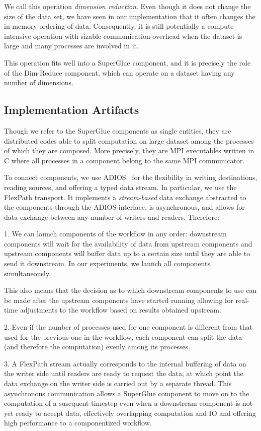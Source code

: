 We call this operation {\em dimension reduction}.
Even though it does not
change the size of the data set, we have seen in our implementation 
that it often changes the in-memory
ordering of data. Consequently, it is still potentially a
compute-intensive operation with sizable communication overhead
when the dataset is large and many
processes are involved in it.

This operation fits well into a
SuperGlue component, and it is precisely
the role of the Dim-Reduce
component, which can operate on a dataset having
any number of dimensions.

\subsection{Implementation Artifacts}

Though we refer to the SuperGlue components as single entities,
they are distributed
codes able to split computation on large dataset
among the processes of which they are
composed. More precisely, they are MPI executables written in C
where all processes in a component belong to the
same MPI communicator.

To connect components, we use
ADIOS~\cite{lofstead:2009:adaptable}
for the flexibility in writing destinations,
reading sources, and offering a
typed data stream. In particular, we use
the FlexPath transport. It implements
a {\em stream-based} data exchange abstracted to
the components through the
ADIOS interface, is asynchronous, and allows for
data exchange between any
number of writers and readers. Therefore:

1. We can launch components of the workflow
in any order: downstream components
will wait for the availability of data from
upstream components and upstream
components will buffer data up to a certain
size until they are able to send it
downstream. In our experiments,
we launch all components simultaneously.

This also means that the decision as to
which downstream components to use can be made after
the upstream components have started
running allowing for real-time adjustments to the
workflow based on results obtained upstream.
\fi

2. Even if the number of processes used for one
component is different from that used for the previous
one in the workflow, each component can split the data
(and therefore the computation) evenly among its processes.

3. A FlexPath stream actually corresponds
to the internal buffering of data on the writer side
until readers are ready to request the data,
at which point the data exchange
on the writer side is carried out
by a separate thread.
This asynchronous communication allows a 
SuperGlue component to move on to the computation
of a susequent timestep even when a downstream
component is not yet ready to accept data,
effectively overlapping computation and IO
and offering high performance to a componentized workflow.

